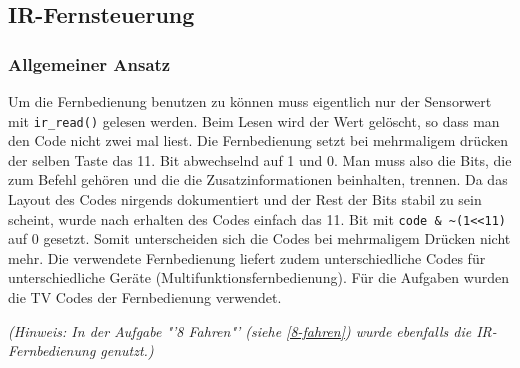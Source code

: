 \subsection{IR-Fernsteuerung}
\label{fernsteuerung}

\subsubsection{Allgemeiner Ansatz}

Um die Fernbedienung benutzen zu können muss eigentlich nur der Sensorwert mit \verb|ir_read()| gelesen werden. Beim Lesen wird der Wert gelöscht, so dass man den Code nicht zwei mal liest. Die Fernbedienung setzt bei mehrmaligem drücken der selben Taste das 11. Bit abwechselnd auf 1 und 0. Man muss also die Bits, die zum Befehl gehören und die die Zusatzinformationen beinhalten, trennen. Da das Layout des Codes nirgends dokumentiert und der Rest der Bits stabil zu sein scheint, wurde nach erhalten des Codes einfach das 11. Bit mit \verb|code & ~(1<<11)| auf 0 gesetzt. Somit unterscheiden sich die Codes bei mehrmaligem Drücken nicht mehr. Die verwendete Fernbedienung liefert zudem unterschiedliche Codes für unterschiedliche Geräte (Multifunktionsfernbedienung). Für die Aufgaben wurden die TV Codes der Fernbedienung verwendet.

\textit{(Hinweis: In der Aufgabe "'8 Fahren"' (siehe \ref{8-fahren}) wurde ebenfalls die IR-Fernbedienung genutzt.)}
